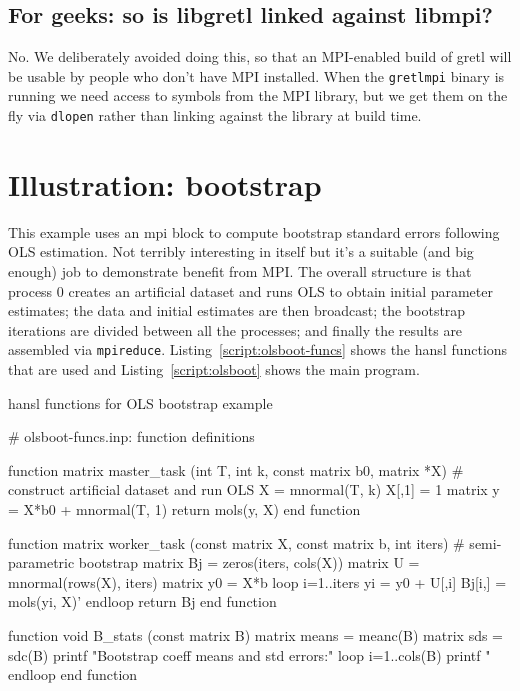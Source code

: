\documentclass{article}
\begin{document}
\subsection{For geeks: so is libgretl linked against libmpi?}

No. We deliberately avoided doing this, so that an MPI-enabled build
of gretl will be usable by people who don't have MPI installed.  When
the \texttt{gretlmpi} binary is running we need access to symbols from
the MPI library, but we get them on the fly via \texttt{dlopen} rather
than linking against the library at build time.

\clearpage


\section{Illustration: bootstrap}
\label{sec:olsboot}

This example uses an mpi block to compute bootstrap standard errors
following OLS estimation. Not terribly interesting in itself but it's
a suitable (and big enough) job to demonstrate benefit from MPI.  The
overall structure is that process 0 creates an artificial dataset and
runs OLS to obtain initial parameter estimates; the data and initial
estimates are then broadcast; the bootstrap iterations are divided
between all the processes; and finally the results are assembled via
\texttt{mpireduce}.  Listing~\ref{script:olsboot-funcs} shows the hansl
functions that are used and Listing~\ref{script:olsboot} shows the main
program.

\begin{script}[htbp]
  \caption{hansl functions for OLS bootstrap example}
  \label{script:olsboot-funcs}
\begin{scode}
# olsboot-funcs.inp: function definitions

function matrix master_task (int T, int k, const matrix b0,
                             matrix *X)
  # construct artificial dataset and run OLS
  X = mnormal(T, k)
  X[,1] = 1
  matrix y = X*b0 + mnormal(T, 1)
  return mols(y, X)
end function

function matrix worker_task (const matrix X, const matrix b,
                             int iters)
  # semi-parametric bootstrap
  matrix Bj = zeros(iters, cols(X))
  matrix U = mnormal(rows(X), iters)
  matrix y0 = X*b
  loop i=1..iters
    yi = y0 + U[,i]
    Bj[i,] = mols(yi, X)'
  endloop
  return Bj
end function

function void B_stats (const matrix B)
  matrix means = meanc(B)
  matrix sds = sdc(B)
  printf "Bootstrap coeff means and std errors:\n\n"
  loop i=1..cols(B)
    printf "%
  endloop
end function
\end{scode}
\end{script}
\end{document}
